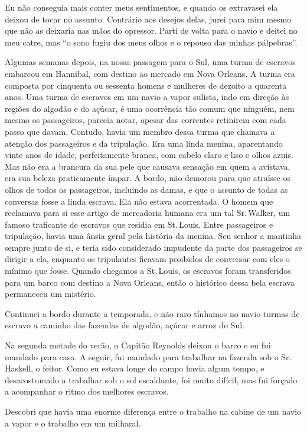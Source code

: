 Eu não conseguia mais conter meus sentimentos, e quando os extravasei
ela deixou de tocar no assunto. Contrário aos desejos delas, jurei para
mim mesmo que não as deixaria nas mãos do opressor. Parti de volta para
o navio e deitei no meu catre, mas ``o sono fugiu dos meus olhos e o
repouso das minhas pálpebras''.

Algumas semanas depois, na nossa passagem para o Sul, uma turma de
escravos embarcou em Hannibal, com destino ao mercado em Nova Orleans. A
turma era composta por cinquenta ou sessenta homens e mulheres de dezoito a 
quarenta anos. Uma turma de escravos em um navio a vapor sulista, indo
em direção às regiões do algodão e do açúcar, é uma ocorrência tão comum
que ninguém, nem mesmo os passageiros, parecia notar, apesar das
correntes retinirem com cada passo que davam. Contudo, havia um membro
dessa turma que chamava a atenção dos passageiros e da tripulação. Era
uma linda menina, aparentando vinte anos de idade, perfeitamente branca,
com cabelo claro e liso e olhos azuis. Mas não era a brancura da sua
pele que causava sensação em quem a avistava, era sua beleza
praticamente ímpar. A bordo, não demorou para que atraísse os olhos de
todos os passageiros, incluindo as damas, e que o assunto de todas as
conversas fosse a linda escrava. Ela não estava acorrentada. O homem que
reclamava para si esse artigo de mercadoria humana era um tal Sr.\,Walker, um famoso traficante de escravos que residia em St.\,Louis. Entre
passageiros e tripulação, havia uma ânsia geral pela história da menina.
Seu senhor a mantinha sempre junto de si, e teria sido considerado
impudente da parte dos passageiros se dirigir a ela, enquanto os
tripulantes ficavam proibidos de conversar com eles o mínimo que fosse.
Quando chegamos a St.\,Louis, os escravos foram transferidos para um
barco com destino a Nova Orleans, então o histórico dessa bela escrava
permaneceu um mistério.

Continuei a bordo durante a temporada, e não raro tínhamos no navio
turmas de escravo a caminho das fazendas de algodão, açúcar e arroz do
Sul.

Na segunda metade do verão, o Capitão Reynolds deixou o barco e eu fui
mandado para casa. A seguir, fui mandado para trabalhar na fazenda sob o
Sr.\,Haskell, o feitor. Como eu estava longe do campo havia algum tempo,
e desacostumado a trabalhar sob o sol escaldante, foi muito difícil, mas
fui forçado a acompanhar o ritmo dos melhores escravos.

Descobri que havia uma enorme diferença entre o trabalho na cabine de um
navio a vapor e o trabalho em um milharal.


